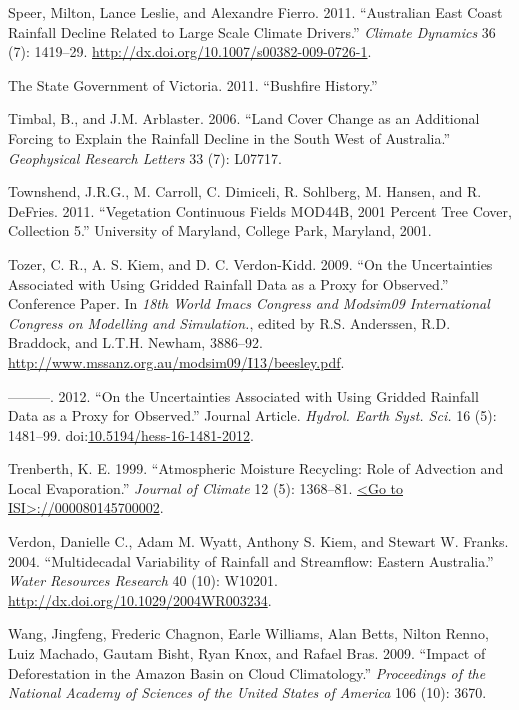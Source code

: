 \documentclass[fleqn,10pt,lineno]{wlpeerj} %
\begin{document}
\hypertarget{ref-Speer2011}{}
Speer, Milton, Lance Leslie, and Alexandre Fierro. 2011. ``Australian
East Coast Rainfall Decline Related to Large Scale Climate Drivers.''
\emph{Climate Dynamics} 36 (7): 1419--29.
\url{http://dx.doi.org/10.1007/s00382-009-0726-1}.

\hypertarget{ref-Fire2011}{}
The State Government of Victoria. 2011. ``Bushfire History.''

\hypertarget{ref-Timbal2006}{}
Timbal, B., and J.M. Arblaster. 2006. ``Land Cover Change as an
Additional Forcing to Explain the Rainfall Decline in the South West of
Australia.'' \emph{Geophysical Research Letters} 33 (7): L07717.

\hypertarget{ref-Townshend2011}{}
Townshend, J.R.G., M. Carroll, C. Dimiceli, R. Sohlberg, M. Hansen, and
R. DeFries. 2011. ``Vegetation Continuous Fields MOD44B, 2001 Percent
Tree Cover, Collection 5.'' University of Maryland, College Park,
Maryland, 2001.

\hypertarget{ref-Beesley2009}{}
Tozer, C. R., A. S. Kiem, and D. C. Verdon-Kidd. 2009. ``On the
Uncertainties Associated with Using Gridded Rainfall Data as a Proxy for
Observed.'' Conference Paper. In \emph{18th World Imacs Congress and
Modsim09 International Congress on Modelling and Simulation.}, edited by
R.S. Anderssen, R.D. Braddock, and L.T.H. Newham, 3886--92.
\href{http://www.mssanz.org.au/modsim09/I13/beesley.pdf\%20}{http://www.mssanz.org.au/modsim09/I13/beesley.pdf}.

\hypertarget{ref-Tozer2012}{}
---------. 2012. ``On the Uncertainties Associated with Using Gridded
Rainfall Data as a Proxy for Observed.'' Journal Article. \emph{Hydrol.
Earth Syst. Sci.} 16 (5): 1481--99.
doi:\href{https://doi.org/10.5194/hess-16-1481-2012}{10.5194/hess-16-1481-2012}.

\hypertarget{ref-Trenberth1999}{}
Trenberth, K. E. 1999. ``Atmospheric Moisture Recycling: Role of
Advection and Local Evaporation.'' \emph{Journal of Climate} 12 (5):
1368--81.
\href{\%3CGo\%20to\%20ISI\%3E://000080145700002}{\textless{}Go to ISI\textgreater{}://000080145700002}.

\hypertarget{ref-Verdon2004}{}
Verdon, Danielle C., Adam M. Wyatt, Anthony S. Kiem, and Stewart W.
Franks. 2004. ``Multidecadal Variability of Rainfall and Streamflow:
Eastern Australia.'' \emph{Water Resources Research} 40 (10): W10201.
\url{http://dx.doi.org/10.1029/2004WR003234}.

\hypertarget{ref-Wang2009}{}
Wang, Jingfeng, Frederic Chagnon, Earle Williams, Alan Betts, Nilton
Renno, Luiz Machado, Gautam Bisht, Ryan Knox, and Rafael Bras. 2009.
``Impact of Deforestation in the Amazon Basin on Cloud Climatology.''
\emph{Proceedings of the National Academy of Sciences of the United
States of America} 106 (10): 3670.
\end{document}
